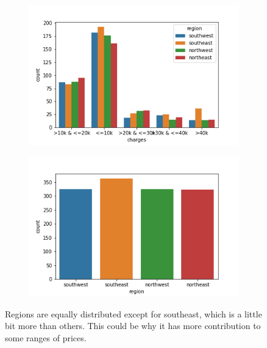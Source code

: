 \documentclass[12pt]{article}
\begin{document}
\begin{figure}[H]
\centering
\begin{subfigure}{0.5\textwidth}
\includegraphics[width=\textwidth]{region.png}
\end{subfigure}
\begin{subfigure}{0.5\textwidth}
\includegraphics[width=\textwidth]{region_dist.png}
\end{subfigure}
\label{mesh:fig1}
\caption{Regions are equally distributed except for southeast, which is a little bit more than others. This could be why it has more contribution to some ranges of prices.}
\end{figure}
\end{document}
